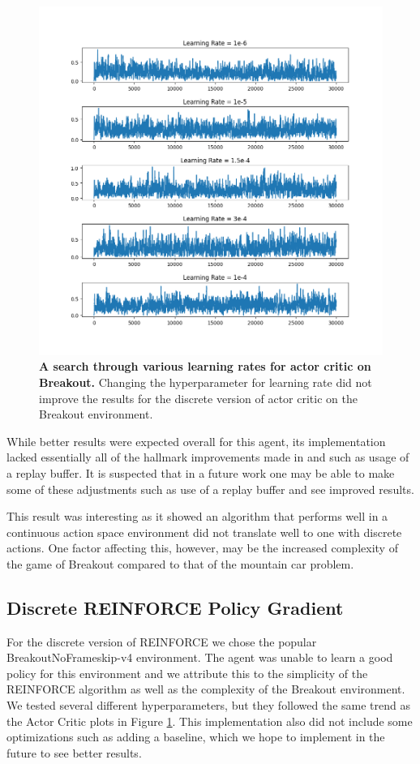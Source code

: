 \documentclass[conference]{IEEEtran}
\begin{document}
\begin{figure}[htbp]
\centerline{\includegraphics[scale=0.4]{actor_critic_breakout_lr_search.png}}
\caption{\textbf{A search through various learning rates for actor critic on Breakout.}  Changing the hyperparameter for learning rate did not improve the results for the discrete version of actor critic on the Breakout environment.}
\label{fig:actorCriticLearningRateSearch}
\end{figure}

While better results were expected overall for this agent, its implementation lacked essentially all of the hallmark improvements made in \cite{DQNOriginalPaper} and \cite{NatureDeepLearning} such as usage of a replay buffer.
It is suspected that in a future work one may be able to make some of these adjustments such as use of a replay buffer and see improved results.

This result was interesting as it showed an algorithm that performs well in a continuous action space environment did not translate well to one with discrete actions.
One factor affecting this, however, may be the increased complexity of the game of Breakout compared to that of the mountain car problem.

\subsection{Discrete REINFORCE Policy Gradient}
For the discrete version of REINFORCE we chose the popular BreakoutNoFrameskip-v4 environment. The agent was unable to learn a good policy for this environment and we attribute this to the simplicity of the REINFORCE algorithm as well as the complexity of the Breakout environment. We tested several different hyperparameters, but they followed the same trend as the Actor Critic plots in Figure \ref{fig:actorCriticLearningRateSearch}.
This implementation also did not include some optimizations such as adding a baseline, which we hope to implement in the future to see better results.
\end{document}
